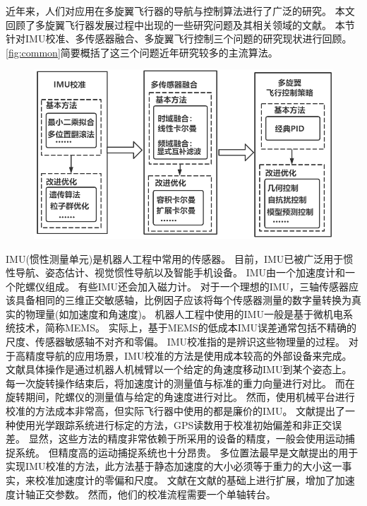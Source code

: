 \documentclass[
  type=master
]{gdutthesis}
\begin{document}
近年来，人们对应用在多旋翼飞行器的导航与控制算法进行了广泛的研究。
本文回顾了多旋翼飞行器发展过程中出现的一些研究问题及其相关领域的文献。
本节针对IMU校准、多传感器融合、多旋翼飞行控制三个问题的研究现状进行回顾。
\autoref{fig:common}简要概括了这三个问题近年研究较多的主流算法\cite{mahony2008nonlinear,tedaldi2014robust,lee2010geometric,sarkka2017multi,benziane2016attitude,刘烨秋2019基于非线性观测器的飞行器姿态控制方法与应用,王成2018四旋翼无人机飞行控制算法综述,李轾2020两种欠驱动系统的非线性控制方法研究}。
\begin{figure}[H]
	\centering
	\includegraphics[width=1.0\textwidth]{微信图片_20220504201551.png}
	\label{fig:common}
\end{figure}

IMU(惯性测量单元)是机器人工程中常用的传感器。
目前，IMU已被广泛用于惯性导航、姿态估计、视觉惯性导航以及智能手机设备\cite{saha2022tinyodom,qiu2022compensation,jung2022photometric,guo2022robust}。
IMU由一个加速度计和一个陀螺仪组成。
有些IMU还会加入磁力计。
对于一个理想的IMU，三轴传感器应该具备相同的三维正交敏感轴，比例因子应该将每个传感器测量的数字量转换为真实的物理量(如加速度和角速度)。
机器人工程中使用的IMU一般是基于微机电系统技术，简称MEMS。
实际上，基于MEMS的低成本IMU误差通常包括不精确的尺度、传感器敏感轴不对齐和零偏。
IMU校准指的是辨识这些物理量的过程。
对于高精度导航的应用场景，IMU校准的方法是使用成本较高的外部设备来完成。
文献\parencite{hall2000case}具体操作是通过机器人机械臂以一个给定的角速度移动IMU到某个姿态上。
每一次旋转操作结束后，将加速度计的测量值与标准的重力向量进行对比。
而在旋转期间，陀螺仪的测量值与给定的角速度进行对比。
然而，使用机械平台进行校准的方法成本非常高，但实际飞行器中使用的都是廉价的IMU。
文献\parencite{kim2004initial}提出了一种使用光学跟踪系统进行标定的方法，GPS读数用于校准初始偏差和非正交误差。
显然，这些方法的精度非常依赖于所采用的设备的精度，一般会使用运动捕捉系统。
但精度高的运动捕捉系统也十分昂贵。
多位置法最早是文献\parencite{lotters1998procedure}提出的用于实现IMU校准的方法，此方法基于静态加速度的大小必须等于重力的大小这一事实，来校准加速度计的零偏和尺度。
文献\parencite{syed2007new}在文献\parencite{lotters1998procedure}的基础上进行扩展，增加了加速度计轴正交参数。
然而，他们的校准流程需要一个单轴转台。
\end{document}
